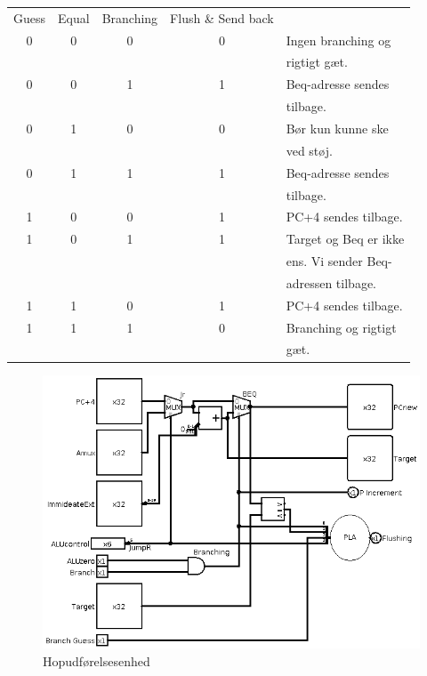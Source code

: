 \documentclass[10pt,a4paper,danish]{article}
\begin{document}
\begin{table}[htb]
    \hspace{1cm}
    \begin{tabular}{ccc|cl}
        Guess & Equal & Branching & Flush \& Send back & \\ \cline{1-4}
        0 & 0 & 0 & 0 & \color{gray}Ingen branching og \\
        &   &   &   & \color{gray}          rigtigt gæt.\\
        0 & 0 & 1 & 1 & \color{gray}Beq-adresse sendes \\
        &   &   &   & \color{gray}          tilbage.\\
        0 & 1 & 0 & 0 & \color{gray}Bør kun kunne ske \\
        &   &   &   & \color{gray}           ved støj.\\
        0 & 1 & 1 & 1 & \color{gray}Beq-adresse sendes \\
        &   &   &   & \color{gray}           tilbage.\\
        1 & 0 & 0 & 1 & \color{gray}PC+4 sendes tilbage.\\
        1 & 0 & 1 & 1 & \color{gray}Target og Beq er ikke\\
        &   &   &   & \color{gray}        ens. Vi sender Beq-\\
        &   &   &   & \color{gray}          adressen tilbage.\\
        1 & 1 & 0 & 1 & \color{gray}PC+4 sendes tilbage.\\
        1 & 1 & 1 & 0 & \color{gray}Branching og rigtigt\\
        &   &   &   & \color{gray}           gæt.\\
    \end{tabular}
\end{table} 

\begin{figure}[htb]
\begin{center}
\leavevmode
\includegraphics[width=1\textwidth]{jump_and_branch_excecution_unit.png}
\end{center}
\caption{Hopudførelsesenhed}
\label{fig:jabe} 
\end{figure}
\end{document}
